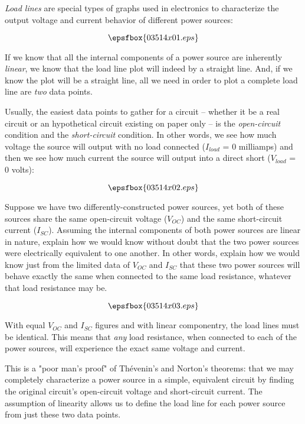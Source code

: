 

{\it Load lines} are special types of graphs used in electronics to characterize the output voltage and current behavior of different power sources:

$$\epsfbox{03514x01.eps}$$

If we know that all the internal components of a power source are inherently {\it linear}, we know that the load line plot will indeed by a straight line.  And, if we know the plot will be a straight line, all we need in order to plot a complete load line are {\it two} data points.

Usually, the easiest data points to gather for a circuit -- whether it be a real circuit or an hypothetical circuit existing on paper only -- is the {\it open-circuit} condition and the {\it short-circuit} condition.  In other words, we see how much voltage the source will output with no load connected ($I_{load}$ = 0 milliamps) and then we see how much current the source will output into a direct short ($V_{load}$ = 0 volts):

$$\epsfbox{03514x02.eps}$$

Suppose we have two differently-constructed power sources, yet both of these sources share the same open-circuit voltage ($V_{OC}$) and the same short-circuit current ($I_{SC}$).  Assuming the internal components of both power sources are linear in nature, explain how we would know without doubt that the two power sources were electrically equivalent to one another.  In other words, explain how we would know just from the limited data of $V_{OC}$ and $I_{SC}$ that these two power sources will behave exactly the same when connected to the same load resistance, whatever that load resistance may be.

$$\epsfbox{03514x03.eps}$$







With equal $V_{OC}$ and $I_{SC}$ figures and with linear componentry, the load lines must be identical.  This means that {\it any} load resistance, when connected to each of the power sources, will experience the exact same voltage and current.







This is a "poor man's proof" of Th\'evenin's and Norton's theorems: that we may completely characterize a power source in a simple, equivalent circuit by finding the original circuit's open-circuit voltage and short-circuit current.  The assumption of linearity allows us to define the load line for each power source from just these two data points.





